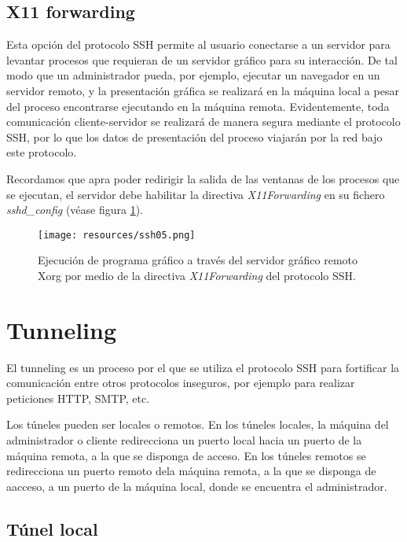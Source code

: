 \documentclass[a4paper, 11pt, titlepage]{article}
\begin{document}
    \subsection{X11 forwarding}\label{X11Forwarding}

        Esta opción del protocolo SSH permite al usuario conectarse a un servidor para levantar procesos 
        que requieran de un servidor gráfico para su interacción. De tal modo que un administrador pueda, 
        por ejemplo, ejecutar un navegador en un servidor remoto, y la presentación gráfica se realizará 
        en la máquina local a pesar del proceso encontrarse ejecutando en la máquina remota. Evidentemente, 
        toda comunicación cliente-servidor se realizará de manera segura mediante el protocolo SSH, por lo que 
        los datos de presentación del proceso viajarán por la red bajo este protocolo.

        Recordamos que apra poder redirigir la salida de las ventanas de los procesos que se ejecutan, el servidor 
        debe habilitar la directiva \textit{X11Forwarding} en su fichero \textit{sshd\_config} (véase 
        figura \ref{ssh05}).

        \begin{figure}[htp]
            \centering
            \texttt{[image: resources/ssh05.png]}
            \caption{Ejecución de programa gráfico a través del servidor gráfico remoto Xorg por medio 
            de la directiva \textit{X11Forwarding} del protocolo SSH.}
            \label{ssh05}
        \end{figure}
    
\section{Tunneling}

    El tunneling es un proceso por el que se utiliza el protocolo SSH para fortificar la comunicación entre 
    otros protocolos inseguros, por ejemplo para realizar peticiones HTTP, SMTP, etc. 

    Los túneles pueden ser locales o remotos. En los túneles locales, la máquina del administrador o cliente 
    redirecciona un puerto local hacia un puerto de la máquina remota, a la que se disponga de acceso. En los 
    túneles remotos se redirecciona un puerto remoto dela máquina remota, a la que se disponga de aacceso, a un 
    puerto de la máquina local, donde se encuentra el administrador.

    \subsection{Túnel local}
\end{document}
